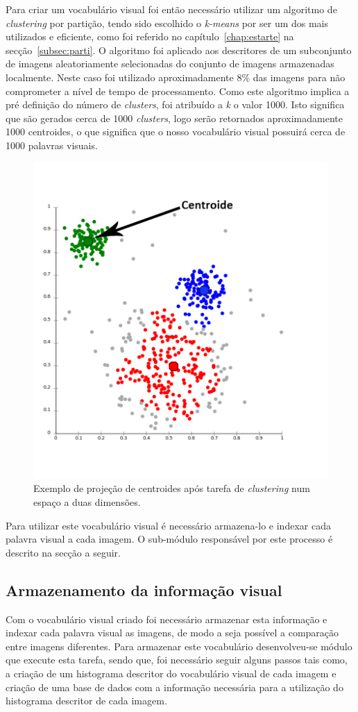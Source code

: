 Para criar um vocabulário visual foi então necessário utilizar um algoritmo de \textit{clustering} por partição, tendo sido escolhido o \textit{k-means} por ser um dos mais utilizados e eficiente, como foi referido no capítulo~\ref{chap:estarte} na secção~\ref{subsec:parti}. O algoritmo foi aplicado aos descritores de um subconjunto de imagens aleatoriamente selecionadas do conjunto de imagens armazenadas localmente. Neste caso foi utilizado aproximadamente 8\% das imagens para não comprometer a nível de tempo de processamento. Como este algoritmo implica a pré definição do número de \textit{clusters}, foi atribuído a \textit{k} o valor 1000. Isto significa que são gerados cerca de 1000 \textit{clusters}, logo serão retornados aproximadamente 1000 centroides, o que significa que o nosso vocabulário visual possuirá cerca de 1000 palavras visuais.

\begin{figure}
\centering
\includegraphics[width=0.6\linewidth]{./figures/centroides}
\caption{Exemplo de projeção de centroides após tarefa de \textit{clustering} num espaço a duas dimensões.}
\label{fig:centroides}
\end{figure}

Para utilizar este vocabulário visual é necessário armazena-lo e indexar cada palavra visual a cada imagem. O sub-módulo responsável por este processo é descrito na secção a seguir.

\subsection{Armazenamento da informação visual}

Com o vocabulário visual criado foi necessário armazenar esta informação e indexar cada palavra visual as imagens, de modo a seja possível a comparação entre imagens diferentes. Para armazenar este vocabulário desenvolveu-se módulo que execute esta tarefa, sendo que, foi necessário seguir alguns passos tais como, a criação de um histograma descritor do vocabulário visual de cada imagem e criação de uma base de dados com a informação necessária para a utilização do histograma descritor de cada imagem.

